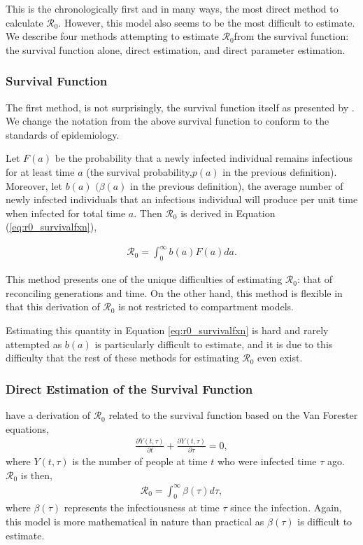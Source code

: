 \documentclass[12pt]{article}
\newcommand{\rr}{\ensuremath{\mathcal{R}_0}}
\begin{document}
This is the chronologically first and in many ways, the most direct method to calculate \rr.  However, this model also seems to be the most difficult to estimate.  We describe four methods attempting to estimate \rr from the survival function:  the survival function alone, direct estimation, and direct parameter estimation.


\subsubsection{Survival Function}
\label{sec:survival_fxn}
The first method, is not surprisingly, the survival function itself as presented by \cite{Heffernan2005}.  We change the notation from the above survival function to conform to the standards of epidemiology.  

Let $F(a)$ be the probability that a newly infected individual remains infectious for at least time $a$ (the survival probability,$p(a)$ in the previous definition).  Moreover, let $b(a)$ $(\beta (a)$ in the previous definition), the average number of newly infected individuals that an infectious individual will produce per unit time when infected for total time $a$.  Then $\rr$ is derived in Equation (\ref{eq:r0_survivalfxn}),

\begin{align}\label{eq:r0_survivalfxn}
  \rr = \int_0^\infty b(a)F(a)da.
\end{align}

This method presents one of the unique difficulties of estimating \rr: that of reconciling generations and time.  On the other hand, this method is flexible in that this derivation of $\rr$ is not restricted to compartment models.

Estimating this quantity in Equation \ref{eq:r0_survivalfxn} is hard and rarely attempted as $b(a)$ is particularly difficult to estimate, and it is due to this difficulty that the rest of these methods for estimating $\rr$ even exist.  


\subsubsection{Direct Estimation of the Survival Function }
\label{sec:direct-estim-surv}

\cite{fraser2004factors} have a derivation of $\rr$ related to the survival function based on the Van Forester equations,
\begin{align*}
  \frac{\partial Y(t, \tau)}{\partial t} +   \frac{\partial Y(t, \tau)}{\partial \tau} = 0,
\end{align*}
where $Y(t,\tau)$ is the number of people at time $t$ who were infected time $\tau$ ago.  $\rr$  is then,
\begin{align*}
\rr = \int_0^\infty \beta(\tau) d\tau,
\end{align*}
 where $\beta (\tau)$ represents the infectiousness at time $\tau$ since the infection.  Again, this model is more mathematical in nature than practical as $\beta (\tau)$ is difficult to estimate.
\end{document}
